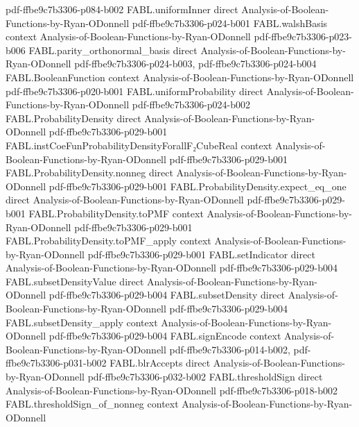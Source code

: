 \begin{theorem}
  {pdf-ffbe9c7b3306-p084-b002}
\proofstep
  {FABL.uniformInner}
  {direct}
  {Analysis-of-Boolean-Functions-by-Ryan-ODonnell}
  {pdf-ffbe9c7b3306-p024-b001}
\proofstep
  {FABL.walshBasis}
  {context}
  {Analysis-of-Boolean-Functions-by-Ryan-ODonnell}
  {pdf-ffbe9c7b3306-p023-b006}
\proofstep
  {FABL.parity_orthonormal_basis}
  {direct}
  {Analysis-of-Boolean-Functions-by-Ryan-ODonnell}
  {pdf-ffbe9c7b3306-p024-b003,
    pdf-ffbe9c7b3306-p024-b004}
\proofstep
  {FABL.BooleanFunction}
  {context}
  {Analysis-of-Boolean-Functions-by-Ryan-ODonnell}
  {pdf-ffbe9c7b3306-p020-b001}
\proofstep
  {FABL.uniformProbability}
  {direct}
  {Analysis-of-Boolean-Functions-by-Ryan-ODonnell}
  {pdf-ffbe9c7b3306-p024-b002}
\proofstep
  {FABL.ProbabilityDensity}
  {direct}
  {Analysis-of-Boolean-Functions-by-Ryan-ODonnell}
  {pdf-ffbe9c7b3306-p029-b001}
\proofstep
  {FABL.instCoeFunProbabilityDensityForallF₂CubeReal}
  {context}
  {Analysis-of-Boolean-Functions-by-Ryan-ODonnell}
  {pdf-ffbe9c7b3306-p029-b001}
\proofstep
  {FABL.ProbabilityDensity.nonneg}
  {direct}
  {Analysis-of-Boolean-Functions-by-Ryan-ODonnell}
  {pdf-ffbe9c7b3306-p029-b001}
\proofstep
  {FABL.ProbabilityDensity.expect_eq_one}
  {direct}
  {Analysis-of-Boolean-Functions-by-Ryan-ODonnell}
  {pdf-ffbe9c7b3306-p029-b001}
\proofstep
  {FABL.ProbabilityDensity.toPMF}
  {context}
  {Analysis-of-Boolean-Functions-by-Ryan-ODonnell}
  {pdf-ffbe9c7b3306-p029-b001}
\proofstep
  {FABL.ProbabilityDensity.toPMF_apply}
  {context}
  {Analysis-of-Boolean-Functions-by-Ryan-ODonnell}
  {pdf-ffbe9c7b3306-p029-b001}
\proofstep
  {FABL.setIndicator}
  {direct}
  {Analysis-of-Boolean-Functions-by-Ryan-ODonnell}
  {pdf-ffbe9c7b3306-p029-b004}
\proofstep
  {FABL.subsetDensityValue}
  {direct}
  {Analysis-of-Boolean-Functions-by-Ryan-ODonnell}
  {pdf-ffbe9c7b3306-p029-b004}
\proofstep
  {FABL.subsetDensity}
  {direct}
  {Analysis-of-Boolean-Functions-by-Ryan-ODonnell}
  {pdf-ffbe9c7b3306-p029-b004}
\proofstep
  {FABL.subsetDensity_apply}
  {context}
  {Analysis-of-Boolean-Functions-by-Ryan-ODonnell}
  {pdf-ffbe9c7b3306-p029-b004}
\proofstep
  {FABL.signEncode}
  {context}
  {Analysis-of-Boolean-Functions-by-Ryan-ODonnell}
  {pdf-ffbe9c7b3306-p014-b002,
    pdf-ffbe9c7b3306-p031-b002}
\proofstep
  {FABL.blrAccepts}
  {direct}
  {Analysis-of-Boolean-Functions-by-Ryan-ODonnell}
  {pdf-ffbe9c7b3306-p032-b002}
\proofstep
  {FABL.thresholdSign}
  {direct}
  {Analysis-of-Boolean-Functions-by-Ryan-ODonnell}
  {pdf-ffbe9c7b3306-p018-b002}
\proofstep
  {FABL.thresholdSign_of_nonneg}
  {context}
  {Analysis-of-Boolean-Functions-by-Ryan-ODonnell}

\end{theorem}

